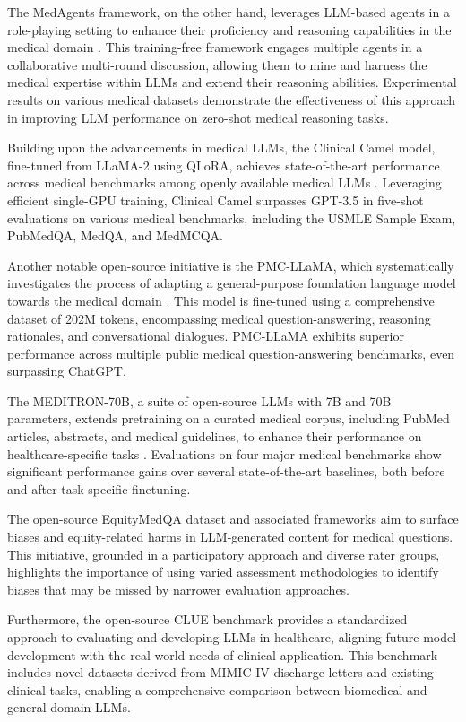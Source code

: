 \documentclass[11pt]{article}
\begin{document}
The MedAgents framework, on the other hand, leverages LLM-based agents in a role-playing setting to enhance their proficiency and reasoning capabilities in the medical domain \cite{ref316}. This training-free framework engages multiple agents in a collaborative multi-round discussion, allowing them to mine and harness the medical expertise within LLMs and extend their reasoning abilities. Experimental results on various medical datasets demonstrate the effectiveness of this approach in improving LLM performance on zero-shot medical reasoning tasks.

Building upon the advancements in medical LLMs, the Clinical Camel model, fine-tuned from LLaMA-2 using QLoRA, achieves state-of-the-art performance across medical benchmarks among openly available medical LLMs \cite{ref317}. Leveraging efficient single-GPU training, Clinical Camel surpasses GPT-3.5 in five-shot evaluations on various medical benchmarks, including the USMLE Sample Exam, PubMedQA, MedQA, and MedMCQA.

Another notable open-source initiative is the PMC-LLaMA, which systematically investigates the process of adapting a general-purpose foundation language model towards the medical domain \cite{ref318}. This model is fine-tuned using a comprehensive dataset of 202M tokens, encompassing medical question-answering, reasoning rationales, and conversational dialogues. PMC-LLaMA exhibits superior performance across multiple public medical question-answering benchmarks, even surpassing ChatGPT.

The MEDITRON-70B, a suite of open-source LLMs with 7B and 70B parameters, extends pretraining on a curated medical corpus, including PubMed articles, abstracts, and medical guidelines, to enhance their performance on healthcare-specific tasks \cite{ref319}. Evaluations on four major medical benchmarks show significant performance gains over several state-of-the-art baselines, both before and after task-specific finetuning.

The open-source EquityMedQA dataset and associated frameworks \cite{ref81} aim to surface biases and equity-related harms in LLM-generated content for medical questions. This initiative, grounded in a participatory approach and diverse rater groups, highlights the importance of using varied assessment methodologies to identify biases that may be missed by narrower evaluation approaches.

Furthermore, the open-source CLUE benchmark \cite{ref320} provides a standardized approach to evaluating and developing LLMs in healthcare, aligning future model development with the real-world needs of clinical application. This benchmark includes novel datasets derived from MIMIC IV discharge letters and existing clinical tasks, enabling a comprehensive comparison between biomedical and general-domain LLMs.
\end{document}
